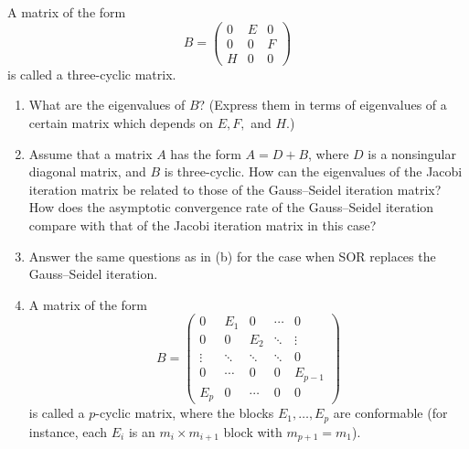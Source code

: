 \documentclass{ctexart}
\begin{document}
\begin{problem} 
A matrix of the form 
\[
B = 
\begin{pmatrix}
0 & E & 0 \\
0 & 0 & F \\
H & 0 & 0
\end{pmatrix}
\]
is called a three-cyclic matrix.
\begin{enumerate}[label=(\alph*)]
  \item What are the eigenvalues of \( B \)? (Express them in terms of eigenvalues of a certain matrix which depends on \( E, F, \) and \( H \).)
  
  \item Assume that a matrix \( A \) has the form \( A = D + B \), where \( D \) is a nonsingular diagonal matrix, and \( B \) is three-cyclic.  
  How can the eigenvalues of the Jacobi iteration matrix be related to those of the Gauss--Seidel iteration matrix?  
  How does the asymptotic convergence rate of the Gauss--Seidel iteration compare with that of the Jacobi iteration matrix in this case?
  
  \item Answer the same questions as in (b) for the case when SOR replaces the Gauss--Seidel iteration.
  \item    A matrix of the form
\[
B =
\begin{pmatrix}
0      & E_1    & 0      & \cdots & 0      \\
0      & 0      & E_2    & \ddots & \vdots \\
\vdots & \ddots & \ddots & \ddots & 0      \\
0      & \cdots & 0      & 0      & E_{p-1} \\
E_p    & 0      & \cdots & 0      & 0
\end{pmatrix}
\]
is called a \(p\)-cyclic matrix, where the blocks \(E_1,\dots,E_p\) are conformable
(for instance, each \(E_i\) is an \(m_i\times m_{i+1}\) block with \(m_{p+1}=m_1\)).
\end{enumerate}
\end{problem}
\end{document}
